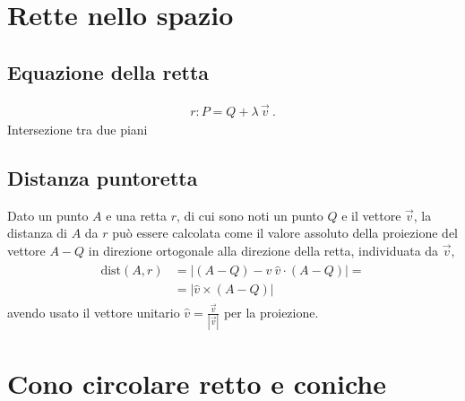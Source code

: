 \documentclass[letterpaper,10pt,english]{jupyterBook}
\begin{document}
\section{Rette nello spazio}
\label{\detokenize{ch/analytic_geometry/analytic_geometry_3d/lines:rette-nello-spazio}}\label{\detokenize{ch/analytic_geometry/analytic_geometry_3d/lines:geometry-analytic-3d-lines}}\label{\detokenize{ch/analytic_geometry/analytic_geometry_3d/lines::doc}}

\subsection{Equazione della retta}
\label{\detokenize{ch/analytic_geometry/analytic_geometry_3d/lines:equazione-della-retta}}
\sphinxAtStartPar
{}
\begin{equation*}
\begin{split}r: P = Q + \lambda \, \vec{v} \ .\end{split}
\end{equation*}
\sphinxAtStartPar
{} Intersezione tra due piani


\subsection{Distanza punto\sphinxhyphen{}retta}
\label{\detokenize{ch/analytic_geometry/analytic_geometry_3d/lines:distanza-punto-retta}}
\sphinxAtStartPar
Dato un punto \(A\) e una retta \(r\), di cui sono noti un punto \(Q\) e il vettore \(\vec{v}\), la distanza di \(A\) da \(r\) può essere calcolata come il valore assoluto della proiezione del vettore \(A-Q\) in direzione ortogonale alla direzione della retta, individuata da \(\vec{v}\),
\begin{equation*}
\begin{split}\begin{aligned}
\text{dist}(A,r) & = \left| (A-Q) - \hat{v} \ \hat{v} \cdot (A-Q) \right| = \\ 
                 & = \left| \hat{v} \times (A-Q) \right| 
\end{aligned}\end{split}
\end{equation*}
\sphinxAtStartPar
avendo usato il vettore unitario \(\hat{v} = \frac{\vec{v}}{|\vec{v}|}\) per la proiezione.

\sphinxstepscope


\section{Cono circolare retto e coniche}
\label{\detokenize{ch/analytic_geometry/analytic_geometry_3d/cone:cono-circolare-retto-e-coniche}}\label{\detokenize{ch/analytic_geometry/analytic_geometry_3d/cone:geometry-analytic-3d-cone}}\label{\detokenize{ch/analytic_geometry/analytic_geometry_3d/cone::doc}}
\end{document}

